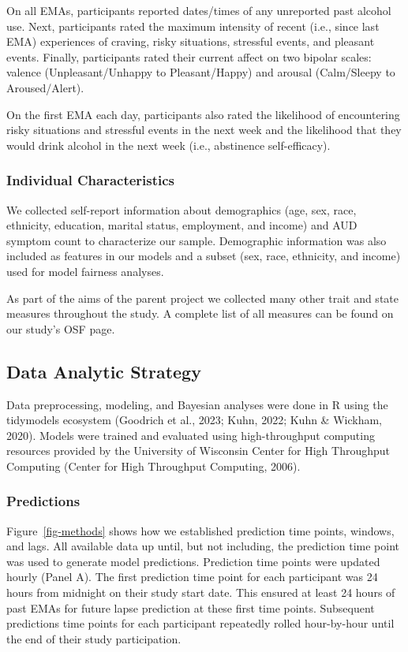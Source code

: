 \documentclass[
]{agujournal2019}
\begin{document}
On all EMAs, participants reported dates/times of any unreported past
alcohol use. Next, participants rated the maximum intensity of recent
(i.e., since last EMA) experiences of craving, risky situations,
stressful events, and pleasant events. Finally, participants rated their
current affect on two bipolar scales: valence (Unpleasant/Unhappy to
Pleasant/Happy) and arousal (Calm/Sleepy to Aroused/Alert).

On the first EMA each day, participants also rated the likelihood of
encountering risky situations and stressful events in the next week and
the likelihood that they would drink alcohol in the next week (i.e.,
abstinence self-efficacy).

\subsubsection{Individual
Characteristics}\label{individual-characteristics}

We collected self-report information about demographics (age, sex, race,
ethnicity, education, marital status, employment, and income) and AUD
symptom count to characterize our sample. Demographic information was
also included as features in our models and a subset (sex, race,
ethnicity, and income) used for model fairness analyses.

As part of the aims of the parent project we collected many other trait
and state measures throughout the study. A complete list of all measures
can be found on our study's OSF page.

\subsection{Data Analytic Strategy}\label{data-analytic-strategy}

Data preprocessing, modeling, and Bayesian analyses were done in R using
the tidymodels ecosystem (Goodrich et al., 2023; Kuhn, 2022; Kuhn \&
Wickham, 2020). Models were trained and evaluated using high-throughput
computing resources provided by the University of Wisconsin Center for
High Throughput Computing (Center for High Throughput Computing, 2006).

\subsubsection{Predictions}\label{predictions}

Figure~\ref{fig-methods} shows how we established prediction time
points, windows, and lags. All available data up until, but not
including, the prediction time point was used to generate model
predictions. Prediction time points were updated hourly (Panel A). The
first prediction time point for each participant was 24 hours from
midnight on their study start date. This ensured at least 24 hours of
past EMAs for future lapse prediction at these first time points.
Subsequent predictions time points for each participant repeatedly
rolled hour-by-hour until the end of their study participation.
\end{document}
